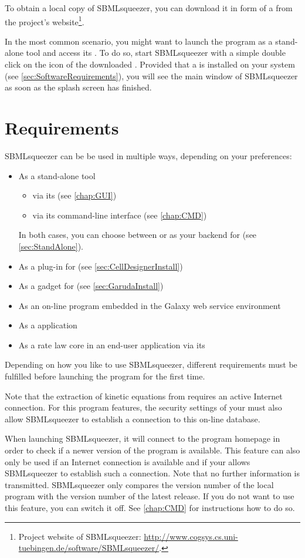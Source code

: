 To obtain a local copy of SBMLsqueezer, you can download it in form of a 
\JAR from the project's website\footnote{Project website of SBMLsqueezer: \url{http://www.cogsys.cs.uni-tuebingen.de/software/SBMLsqueezer/}.}.

In the most common scenario, you might want to launch the program as a
stand-alone tool and access its \GUI. To do so,
start SBMLsqueezer with a simple double click on the icon of the downloaded
\JAR.
Provided that a \JVM is installed on your system 
(see \vref{sec:SoftwareRequirements}), you will see the main window of
SBMLsqueezer as soon as the splash screen has finished.

\section{Requirements}

SBMLsqueezer can be be used in multiple ways, depending on your preferences:
\begin{itemize}
  \item As a stand-alone tool
  \begin{itemize}
    \item via its \GUI (see \vref{chap:GUI})
    \item via its command-line interface (see \vref{chap:CMD})
  \end{itemize}
        In both cases, you can choose between \JSBML or \libSBML as your backend
        for \SBML (see \vref{sec:StandAlone}).
  \item As a plug-in for \CellDesigner (see \vref{sec:CellDesignerInstall})
  \item As a gadget for \Garuda (see \vref{sec:GarudaInstall})
  \item As an on-line program embedded in the Galaxy web service environment \citet{Goecks2010}
  \item As a \JavaWebStart application
  \item As a rate law core in an end-user application via its \API
\end{itemize}
Depending on how you like to use SBMLsqueezer, different requirements must be
fulfilled before launching the program for the first time.

Note that the extraction of kinetic equations from \SABIO requires an active Internet connection.
For this program features, the security settings of your \OS must also allow SBMLsqueezer to establish a connection to this on-line database.

When launching SBMLsqueezer, it will connect to the program homepage in order to check if a newer version of the program is available.
This feature can also only be used if an Internet connection is available and if your \OS allows SBMLsqueezer to establish such a connection.
Note that no further information is transmitted.
SBMLsqueezer only compares the version number of the local program with the version number of the latest release.
If you do not want to use this feature, you can switch it off.
See \vref{chap:CMD} for instructions how to do so.

